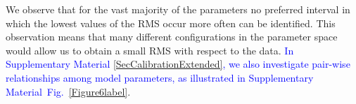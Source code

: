 \documentclass[oneside, 10pt, a4paper, twocolumn]{article}
\begin{document}
We observe that for the vast majority of the parameters no preferred interval in which the lowest values of the RMS occur more often can be identified. %
This observation means that many different configurations in the parameter space would allow us to obtain a small RMS with respect to the data. %
\textcolor{blue}{In Supplementary Material \ref{SecCalibrationExtended}, we also investigate pair-wise relationships among model parameters, as illustrated in Supplementary Material~Fig.~\ref{Figure6label}}.
\end{document}

